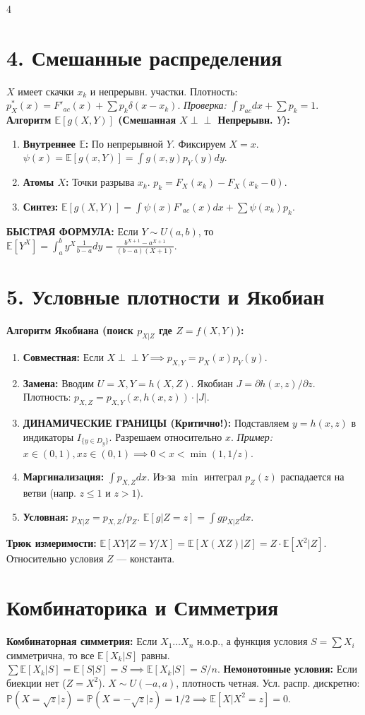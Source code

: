 \documentclass[8pt, a4paper, landscape]{extarticle}
\newcommand{\E}{\mathbb{E}}
\renewcommand{\P}{\mathbb{P}}
\begin{document}
\begin{multicols*}{4}
\section*{4. Смешанные распределения}
$X$ имеет скачки $x_k$ и непрерывн. участки. Плотность: $p_X^*(x) = F'_{ac}(x) + \sum p_k \delta(x-x_k)$. \textit{Проверка:} $\int p_{ac}dx + \sum p_k = 1$.
\textbf{Алгоритм $\E[g(X,Y)]$ (Смешанная $X \perp\!\!\perp$ Непрерывн. $Y$):}
\begin{enumerate}
    \item \textbf{Внутреннее $\E$:} По непрерывной $Y$. Фиксируем $X=x$. $\psi(x) = \E[g(x,Y)] = \int g(x,y)p_Y(y)dy$.
    \item \textbf{Атомы $X$:} Точки разрыва $x_k$. $p_k = F_X(x_k) - F_X(x_k-0)$.
    \item \textbf{Синтез:} $\E[g(X,Y)] = \int \psi(x) F'_{ac}(x) dx + \sum \psi(x_k) p_k$.
\end{enumerate}
\textbf{БЫСТРАЯ ФОРМУЛА:} Если $Y \sim U(a,b)$, то $\E[Y^X] = \int_a^b y^X \frac{1}{b-a} dy = \frac{b^{X+1}-a^{X+1}}{(b-a)(X+1)}$.

\section*{5. Условные плотности и Якобиан}
\textbf{Алгоритм Якобиана (поиск $p_{X|Z}$ где $Z=f(X,Y)$):}
\begin{enumerate}
    \item \textbf{Совместная:} Если $X \perp\!\!\perp Y \implies p_{X,Y} = p_X(x)p_Y(y)$.
    \item \textbf{Замена:} Вводим $U=X, Y=h(X,Z)$. Якобиан $J = \partial h(x,z) / \partial z$. Плотность: $p_{X,Z} = p_{X,Y}(x, h(x,z)) \cdot |J|$.
    \item \textbf{ДИНАМИЧЕСКИЕ ГРАНИЦЫ (Критично!):} Подставляем $y=h(x,z)$ в индикаторы $I_{\{y \in D_y\}}$. Разрешаем относительно $x$. \textit{Пример:} $x \in (0,1), xz \in (0,1) \implies 0 < x < \min(1, 1/z)$.
    \item \textbf{Маргинализация:} $\int p_{X,Z} dx$. Из-за $\min$ интеграл $p_Z(z)$ распадается на ветви (напр. $z \le 1$ и $z > 1$).
    \item \textbf{Условная:} $p_{X|Z} \!=\! p_{X,Z}/p_Z$. $\E[g|Z=z] \!=\! \int g p_{X|Z}dx$.
\end{enumerate}
\textbf{Трюк измеримости:} $\E[XY | Z=Y/X] = \E[X(XZ)|Z] = Z \cdot \E[X^2|Z]$. Относительно условия $Z$ --- константа.

\section*{Комбинаторика и Симметрия}
\textbf{Комбинаторная симметрия:} Если $X_1 \dots X_n$ н.о.р., а функция условия $S = \sum X_i$ симметрична, то все $\E[X_k|S]$ равны.
$\sum \E[X_k|S] = \E[S|S] = S \implies \E[X_k|S] = S/n$.
\textbf{Немонотонные условия:} Если биекции нет ($Z=X^2$).
$X \sim U(-a,a)$, плотность четная. Усл. распр. дискретно: $\P(X=\sqrt{z}|z) = \P(X=-\sqrt{z}|z) = 1/2 \implies \E[X|X^2=z] = 0$.


\end{multicols*}
\end{document}
